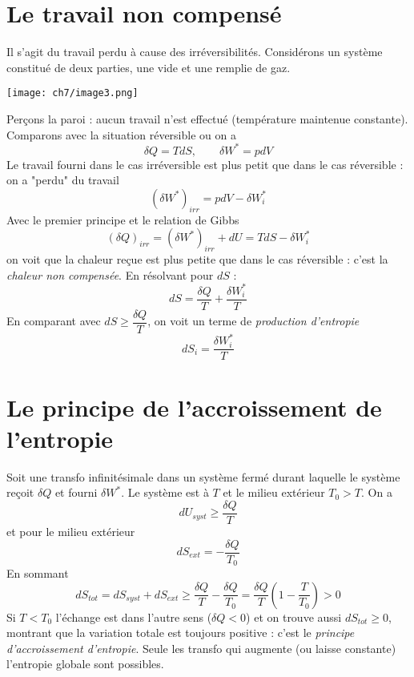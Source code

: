 	\section{Le travail non compensé}
	Il s'agit du travail perdu à cause des irréversibilités. Considérons un 
	système constitué de deux parties, une vide et une remplie de gaz. 
	\begin{center}
	\texttt{[image: ch7/image3.png]}
	\end{center}	
	Perçons 
	la paroi : aucun travail n'est effectué (température maintenue constante). 
	Comparons avec la situation réversible ou on a 
	\begin{equation}
	\delta Q = TdS,\qquad \delta W^* = pdV
	\end{equation}
	Le travail fourni dans le cas irréversible est plus petit que dans le cas 
	réversible : on a "perdu" du travail 
	\begin{equation}
	(\delta W^*)_{irr} = pdV - \delta W_i^*
	\end{equation}
	Avec le premier principe et le relation de Gibbs
	\begin{equation}
	(\delta Q)_{irr} = (\delta W^*)_{irr} + dU = TdS - \delta W_i^*
	\end{equation}
	on voit que la chaleur reçue est plus petite que dans le cas réversible : 
	c'est la \textit{chaleur non compensée}. En résolvant pour $dS$ :
	\begin{equation}
	dS = \dfrac{\delta Q}{T}+\dfrac{\delta W_i^*}{T}
	\end{equation}
	En comparant avec $dS \geq \dfrac{\delta Q}{T}$, on voit un terme de 
	\textit{production d'entropie}
	\begin{equation}
	dS_i = \dfrac{\delta W_i^*}{T}
	\end{equation}
	
	
	\section{Le principe de l’accroissement de l’entropie}
	Soit une transfo infinitésimale dans un système fermé durant laquelle le 
	système reçoit $\delta Q$ et fourni $\delta W^*$. Le système est à $T$ et 
	le milieu extérieur $T_0>T$. On a 
	\begin{equation}
	dU_{syst} \geq \dfrac{\delta Q}{T}
	\end{equation}
	et pour le milieu extérieur 
	\begin{equation}
	dS_{ext} = -\dfrac{\delta Q}{T_0}
	\end{equation}
	En sommant
	\begin{equation}
	dS_{tot} = dS_{syst} + dS_{ext} \geq \dfrac{\delta Q}{T}-\dfrac{\delta Q}{
	T_0} = \dfrac{\delta Q}{T}\left(1-\dfrac{T}{T_0}\right) > 0
	\end{equation}
	Si $T < T_0$ l'échange est dans l'autre sens ($\delta Q <0$) et on trouve 
	aussi $dS_{tot} \geq 0$, montrant que la variation totale est toujours 
	positive : c'est le \textit{principe d'accroissement d'entropie}. Seule les 
	transfo qui augmente (ou laisse constante) l'entropie globale sont possibles.\\
	
